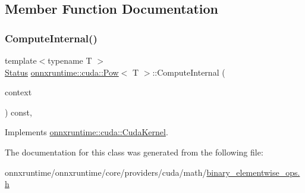 \subsection{Member Function Documentation}
\mbox{\label{classonnxruntime_1_1cuda_1_1Pow_a8d0954d35262ed182961ca491c4ffee7}} 
\subsubsection{\texorpdfstring{Compute\+Internal()}{ComputeInternal()}}
{\footnotesize\ttfamily template$<$typename T $>$ \\
\mbox{\hyperlink{classonnxruntime_1_1common_1_1Status}{Status}} \mbox{\hyperlink{classonnxruntime_1_1cuda_1_1Pow}{onnxruntime\+::cuda\+::\+Pow}}$<$ T $>$\+::Compute\+Internal (\begin{DoxyParamCaption}\item[{\mbox{\hyperlink{classonnxruntime_1_1OpKernelContext}{Op\+Kernel\+Context}} $\ast$}]{context }\end{DoxyParamCaption}) const\hspace{0.3cm}{\ttfamily [override]}, {\ttfamily [virtual]}}



Implements \mbox{\hyperlink{classonnxruntime_1_1cuda_1_1CudaKernel_aca7af04ae448017d6023d30bba231ebb}{onnxruntime\+::cuda\+::\+Cuda\+Kernel}}.



The documentation for this class was generated from the following file\+:\begin{DoxyCompactItemize}
\item 
onnxruntime/onnxruntime/core/providers/cuda/math/\mbox{\hyperlink{binary__elementwise__ops_8h}{binary\+\_\+elementwise\+\_\+ops.\+h}}\end{DoxyCompactItemize}
